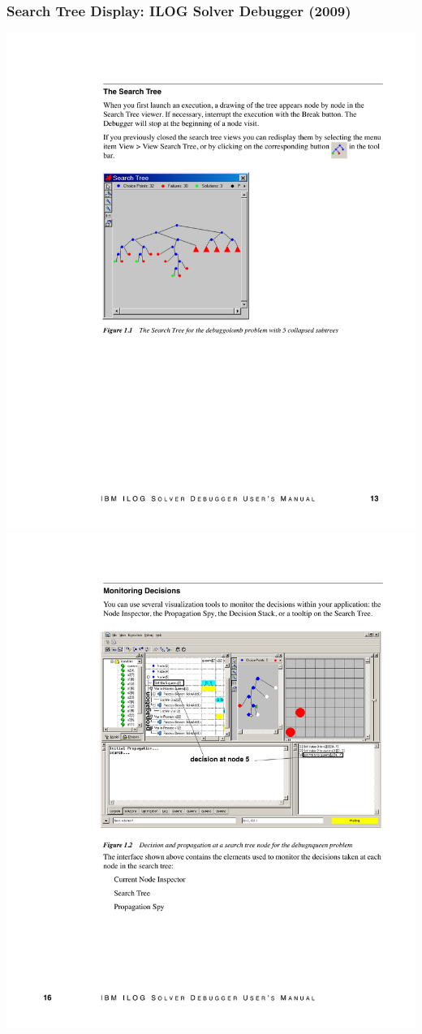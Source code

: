 \begin{frame}
  \frametitle{Search Tree Display: ILOG Solver Debugger (2009)}
  
  \includegraphics[height=.6\textheight]{images/ilog_debugger_tree.pdf}
  \includegraphics[height=.6\textheight]{images/ilog_debugger_window.pdf}
  
\end{frame}

